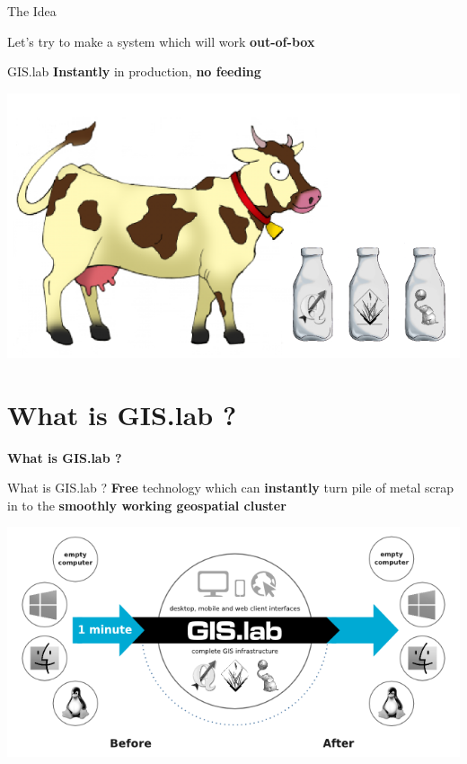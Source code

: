 \documentclass[12pt]{beamer}
\begin{document}
\begin{frame}{The Idea}
	\begin{center}
		Let's try to make a system which will work \textbf{out-of-box}
	\end{center}
\end{frame}

\begin{frame}{GIS.lab}
	\textbf{Instantly} in production, \textbf{no feeding}
	\begin{center}
		\includegraphics[keepaspectratio=true,height=0.6\textheight]{images/cow-geospatial.png}
	\end{center}
\end{frame}


\section{What is GIS.lab ?}
\begin{frame}
	\begin{center}
		\LARGE\textbf{What is GIS.lab ?}
	\end{center}
\end{frame}

\begin{frame}{What is GIS.lab ?}
	\textbf{Free} technology which can \textbf{instantly} turn pile of metal scrap in to the \textbf{smoothly working geospatial cluster}
	\begin{center}
		\includegraphics[keepaspectratio=true,height=0.5\textheight]{images/gislab-schema.png}
	\end{center}
\end{frame}
\end{document}
